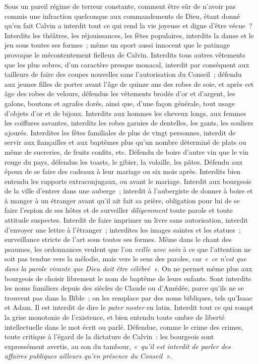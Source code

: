 \documentclass[french,twoside]{book} %
\begin{document}
Sous un pareil régime de terreur constante, comment être sûr de n’avoir pas commis une infraction quelconque aux commandements de Dieu, étant donné qu’en fait Calvin a interdit tout ce qui rend la vie joyeuse et digne d’être vécue ? Interdits les théâtres, les réjouissances, les fêtes populaires, interdits la danse et le jeu sous toutes ses formes ; même un sport aussi innocent que le patinage provoque le mécontentement fielleux de Calvin. Interdits tous autres vêtements que les plus sobres, d’un caractère presque monacal, interdit par conséquent aux tailleurs de faire des coupes nouvelles sans l’autorisation du Conseil ; défendu aux jeunes filles de porter avant l’âge de quinze ans des robes de soie, et après cet âge des robes de velours, défendus les vêtements brodés d’or et d’argent, les galons, boutons et agrafes dorés, ainsi que, d’une façon générale, tout usage d’objets d’or et de bijoux. Interdits aux hommes les cheveux longs, aux femmes les coiffures savantes, interdits les robes garnies de dentelles, les gants, les souliers ajourés. Interdites les fêtes familiales de plus de vingt personnes, interdit de servir aux fiançailles et aux baptêmes plus qu’un nombre déterminé de plats ou même de sucreries, de fruits confits, etc. Défendu de boire d’autre vin que le vin rouge du pays, défendus les toasts, le gibier, la volaille, les pâtes. Défendu aux époux de se faire des cadeaux à leur mariage ou six mois après. Interdits bien entendu les rapports extraconjugaux, ou avant le mariage. Interdit aux bourgeois de la ville d’entrer dans une auberge ; interdit à l’aubergiste de donner à boire et à manger à un étranger avant qu’il ait fait sa prière, obligation pour lui de se faire l’espion de ses hôtes et de surveiller \emph{diligemment} toute parole et toute attitude suspectes. Interdit de faire imprimer un livre sans autorisation, interdit d’envoyer une lettre à l’étranger ; interdites les images saintes et les statues ; surveillance stricte de l’art sous toutes ses formes. Même dans le chant des psaumes, les ordonnances veulent que l’on \emph{veille avec soin} à ce que l’attention ne soit pas tendue vers la mélodie, mais vers le sens des paroles, car \emph{« ce n’est que dans la parole vivante que Dieu doit être célébré »}. On ne permet même plus aux bourgeois de choisir librement le nom de baptême de leurs enfants. Sont interdits les noms familiers depuis des siècles de Claude ou d’Amédée, parce qu’ils ne se trouvent pas dans la Bible ; on les remplace par des noms bibliques, tels qu’Isaac et Adam. Il est interdit de dire le \emph{pater noster} en latin. Interdit tout ce qui rompt la grise monotonie de l’existence, et bien entendu toute ombre de liberté intellectuelle dans le mot écrit ou parlé. Défendue, comme le crime des crimes, toute critique à l’égard de la dictature de Calvin : les bourgeois sont expressément avertis, au son du tambour, \emph{« qu’il est interdit de parler des affaires publiques ailleurs qu’en présence du Conseil »}.\par
\end{document}

